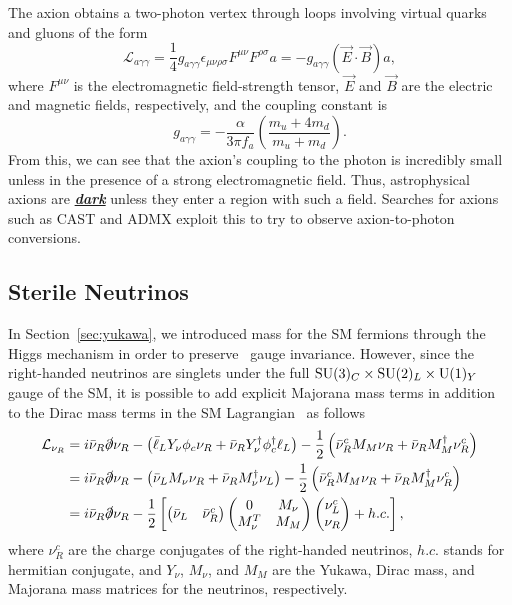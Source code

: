 The axion obtains a two-photon vertex through loops involving virtual quarks and gluons of the form
\begin{equation}
  \mathcal{L}_{a\gamma\gamma} = \frac{1}{4} g_{a\gamma\gamma} \epsilon_{\mu\nu\rho\sigma} F^{\mu\nu} F^{\rho\sigma} a = - g_{a\gamma\gamma} \left(\vec E \cdot \vec B\right) a,
\end{equation}
where $F^{\mu\nu}$ is the electromagnetic field-strength tensor, $\vec E$ and $\vec B$ are the electric and magnetic fields, respectively, and the coupling constant is
\begin{equation}
  g_{a\gamma\gamma} = - \frac{\alpha}{3\pi f_a} \left( \frac{m_u + 4m_d}{m_u + m_d}\right).
\end{equation}
From this, we can see that the axion's coupling to the photon is incredibly small unless in the presence of a strong electromagnetic field.
Thus, astrophysical axions are \underline{\textbf{\textit{dark}}} unless they enter a region with such a field.
Searches for axions such as CAST\cite{CAST2017} and ADMX\cite{ADMX2018a, ADMX2018b} exploit this to try to observe axion-to-photon conversions.

\subsection{Sterile Neutrinos}
\label{sec:dm_sterile}

In Section~\ref{sec:yukawa}, we introduced mass for the SM fermions through the Higgs mechanism in order to preserve \sutwo\ gauge invariance.
However, since the right-handed neutrinos are singlets under the full $\text{SU}(3)_C \times \text{SU}(2)_L \times \text{U}(1)_Y$ gauge of the SM, it is possible to add explicit Majorana mass terms in addition to the Dirac mass terms in the SM Lagrangian~\cite{Drewes2013} as follows
\begin{align}
  \mathcal{L}_{\nu_R} & = i \bar \nu_R \slashed \partial \nu_R
  - \left( \bar \ell_L Y_\nu \phi_c \nu_R + \bar \nu_R Y_\nu^\dagger \phi_c^\dagger \ell_L \right)
  - \frac{1}{2} \left( \bar \nu_R^c M_M \nu_R + \bar \nu_R M_M^\dagger \nu_R^c \right) \nonumber \\
  & = i \bar \nu_R \slashed \partial \nu_R
  - \left( \bar{{\nu}}_L  M_\nu  \nu_R + \bar{{\nu}}_R  M_\nu^\dagger  \nu_L \right)
  - \frac{1}{2} \left( \bar \nu_R^c M_M \nu_R + \bar \nu_R M_M^\dagger \nu_R^c \right) \nonumber \\
  & = i \bar \nu_R \slashed \partial \nu_R
  - \frac{1}{2} \left[ \begin{pmatrix} \bar \nu_L & \bar \nu_R^c \end{pmatrix}
    \begin{pmatrix} 0 & M_\nu \\ M_\nu^T & M_M \end{pmatrix}
    \begin{pmatrix} \nu_L^c \\ \nu_R \end{pmatrix} + h.c. \right], 
\end{align}
where $\nu_R^c$ are the charge conjugates of the right-handed neutrinos, $h.c.$ stands for hermitian conjugate, and $Y_\nu$, $M_\nu$, and $M_M$ are the Yukawa, Dirac mass, and Majorana mass matrices for the neutrinos, respectively.

